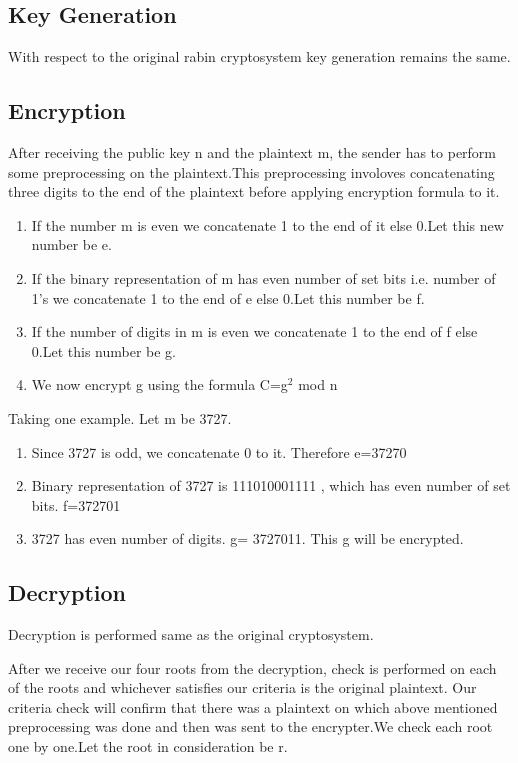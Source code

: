 \documentclass[letterpaper, 12 pt, conference]{ieeeconf}  %
\begin{document}
\subsection{Key Generation}
With respect to the original rabin cryptosystem key generation remains the same.
\subsection{Encryption}
After receiving the public key n and the plaintext m, the sender has to perform some preprocessing on the plaintext.This preprocessing involoves concatenating three digits to the end of the plaintext before applying encryption formula to it.
\begin{enumerate}
  \item If the number m is even we concatenate 1 to the end of it else 0.Let this new number be e.
  \item If the binary representation of m has even number of set bits i.e. number of 1's we concatenate 1 to the end of e else 0.Let this number be f.
  \item If the number of digits in m is even we concatenate 1 to the end of f else 0.Let this number be g.
    \item We now encrypt g using the formula C=g$^2$ mod n
    
\end{enumerate}


Taking one example. Let m be 3727.
\begin{enumerate}
  \item Since 3727 is odd, we concatenate 0 to it. Therefore e=37270
  \item Binary representation of 3727 is 111010001111 , which has even number of set bits. f=372701
  \item 3727 has even number of digits. g= 3727011. This g will be encrypted.
   
    
\end{enumerate}


\subsection{Decryption}
Decryption is performed same as the original cryptosystem.

After we receive our four roots from the decryption, check is performed on each of the roots and whichever satisfies our criteria is the original plaintext. Our criteria check will confirm that there was a plaintext on which above mentioned preprocessing was done and then was sent to the encrypter.We check each root one by one.Let the root in consideration be r.
\end{document}

